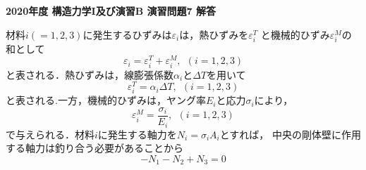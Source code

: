 ﻿\documentclass[10pt,a4j]{jarticle}
\newlength{\minitwocolumn}
\begin{document}
\newcommand{\fat}[1]{\mbox{\boldmath $#1$}}
\newcommand{\D}{\partial}
\newcommand{\w}{\omega}
\newcommand{\ga}{\alpha}
\newcommand{\gb}{\beta}
\newcommand{\gx}{\xi}
\newcommand{\gz}{\zeta}
\newcommand{\vhat}[1]{\hat{\fat{#1}}}
\newcommand{\spc}{\vspace{0.7\baselineskip}}
\newcommand{\halfspc}{\vspace{0.3\baselineskip}}

\pagestyle{empty}
\newcommand{\twofig}[2]
 {
   \begin{figure}[h]
     \begin{minipage}[t]{\minitwocolumn}
         \begin{center}   #1
         \end{center}
     \end{minipage}
         \hspace{\columnsep}
     \begin{minipage}[t]{\minitwocolumn}
         \begin{center} #2
         \end{center}
     \end{minipage}
   \end{figure}
 }
\begin{center}
{\Large \bf 2020年度 構造力学I及び演習B 演習問題7 解答} \\
\end{center}
材料$i(=1,2,3)$に発生するひずみは$\varepsilon_i$は，熱ひずみを$\varepsilon_i^T$
と機械的ひずみ$\varepsilon_i^M$の和として
\begin{equation}
	\varepsilon_i =
	\varepsilon_i^T 
	+
	\varepsilon_i^M, \ \ (i=1,2,3) 
	\label{eqn:eps_sum}
\end{equation}
と表される．熱ひずみは，線膨張係数$\alpha_i$と$\Delta T$を用いて
\begin{equation}
	\varepsilon_i^T= \alpha_i \Delta T, \ \ (i=1,2,3)
\end{equation}
と表される.一方，機械的ひずみは，ヤング率$E_i$と応力$\sigma_i$により，
\begin{equation}
	\varepsilon_i^M= \frac{\sigma_i}{E_i}, \ \ (i=1,2,3)
	\label{eqn:Hooke}
\end{equation}
で与えられる．材料$i$に発生する軸力を$N_i=\sigma_i A_i$とすれば，
中央の剛体壁に作用する軸力は釣り合う必要があることから
\begin{equation}
	-N_1-N_2+N_3=0 
	\label{eqn:equib}
\end{equation}
\end{document}
